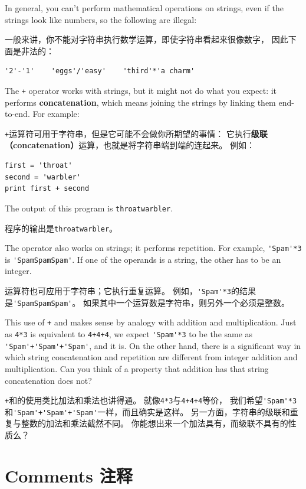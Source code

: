 \documentclass[10pt]{book}
\begin{document}
\begin{CJK}{UTF8}{gbsn}
In general, you can't perform mathematical operations on strings, even
if the strings look like numbers, so the following are illegal:

一般来讲，你不能对字符串执行数学运算，即使字符串看起来很像数字，
因此下面是非法的：

\begin{verbatim}
'2'-'1'    'eggs'/'easy'    'third'*'a charm'
\end{verbatim}
%
The {\tt +} operator works with strings, but it
might not do what you expect: it performs
{\bf concatenation}, which means joining the strings by
linking them end-to-end.  For example:

{\tt +}运算符可用于字符串，但是它可能不会做你所期望的事情：
它执行{\bf 级联（concatenation）}运算，也就是将字符串端到端的连起来。
例如：

\begin{verbatim}
first = 'throat'
second = 'warbler'
print first + second
\end{verbatim}
%
The output of this program is {\tt throatwarbler}.

程序的输出是{\tt throatwarbler}。

The {\tt *} operator also works on strings; it performs repetition.
For example, \verb"'Spam'*3" is \verb"'SpamSpamSpam'".  If one of the operands
is a string, the other has to be an integer.

{\tt *}运算符也可应用于字符串；它执行重复运算。
例如，\verb"'Spam'*3"的结果是\verb"'SpamSpamSpam'"。
如果其中一个运算数是字符串，则另外一个必须是整数。

This use of {\tt +} and {\tt *} makes sense by
analogy with addition and multiplication.  Just as {\tt 4*3} is
equivalent to {\tt 4+4+4}, we expect \verb"'Spam'*3" to be the same as
\verb"'Spam'+'Spam'+'Spam'", and it is.  On the other hand, there is a
significant way in which string concatenation and repetition are
different from integer addition and multiplication.
Can you think of a property that addition has
that string concatenation does not?

{\tt +}和{\tt *}的使用类比加法和乘法也讲得通。
就像{\tt 4*3}与{\tt 4+4+4}等价，
我们希望\verb"'Spam'*3"和\verb"'Spam'+'Spam'+'Spam'"一样，而且确实是这样。
另一方面，字符串的级联和重复与整数的加法和乘法截然不同。
你能想出来一个加法具有，而级联不具有的性质么？

\section{Comments 注释}


\end{CJK}
\end{document}
